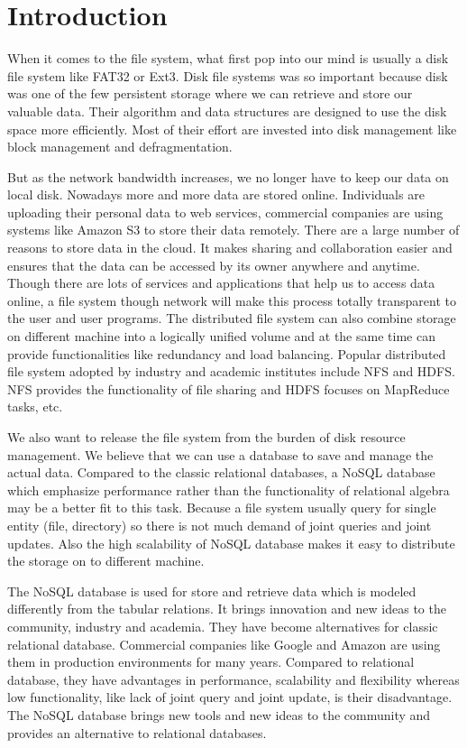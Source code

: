 \chapter{Introduction}
\label{chap:intro}

    When it comes to the file system, what first pop into our mind is usually a disk file system like FAT32 or Ext3. Disk file systems was so important because disk was one of the few persistent storage where we can retrieve and store our valuable data. Their algorithm and data structures are designed to use the disk space more efficiently. Most of their effort are invested into disk management like block management and defragmentation. 

    But as the network bandwidth increases, we no longer have to keep our data on local disk. Nowadays more and more data are stored online. Individuals are uploading their personal data to web services, commercial companies are using systems like Amazon S3 to store their data remotely. There are a large number of reasons to store data in the cloud. It makes sharing and collaboration easier and ensures that the data can be accessed by its owner anywhere and anytime. Though there are lots of services and applications that help us to access data online, a file system though network will make this process totally transparent to the user and user programs. The distributed file system can also combine storage on different machine into a logically unified volume and at the same time can provide functionalities like redundancy and load balancing. Popular distributed file system adopted by industry and academic institutes include NFS and HDFS. NFS provides the functionality of file sharing and HDFS focuses on MapReduce tasks, etc.

    We also want to release the file system from the burden of disk resource management. We believe that we can use a database to save and manage the actual data. Compared to the classic relational databases, a NoSQL database which emphasize performance rather than the functionality of relational algebra may be a better fit to this task. Because a file system usually query for single entity (file, directory) so there is not much demand of joint queries and joint updates. Also the high scalability of NoSQL database makes it easy to distribute the storage on to different machine.

    The NoSQL database is used for store and retrieve data which is modeled differently from the tabular relations. It brings innovation and new ideas to the community, industry and academia. They have become alternatives for classic relational database. Commercial companies like Google and Amazon are using them in production environments for many years. Compared to relational database, they have advantages in performance, scalability and flexibility whereas low functionality, like lack of joint query and joint update, is their disadvantage. The NoSQL database brings new tools and new ideas to the community and provides an alternative to relational databases. 

